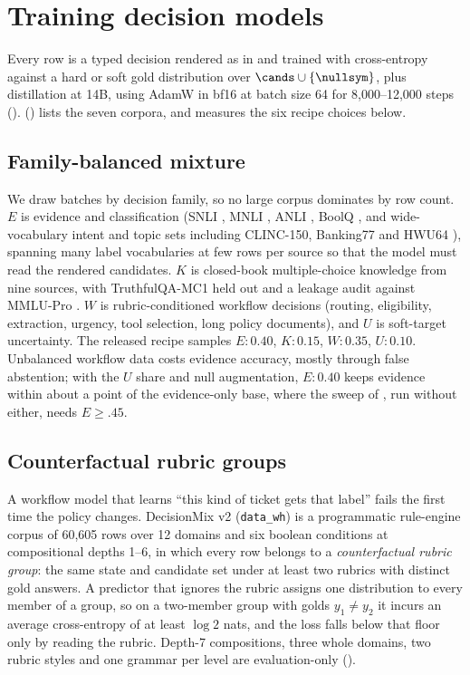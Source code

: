 \section{Training decision models}
\label{sec:train}

Every row is a typed decision rendered as in  and trained with cross-entropy
against a hard or soft gold distribution over $\cands \cup \{\nullsym\}$, plus distillation at 14B,
using AdamW in bf16 at batch size 64 for 8{,}000--12{,}000 steps ().
 () lists the seven corpora, and 
measures the six recipe choices below.

\subsection{Family-balanced mixture}
\label{sec:train:mixture}

We draw batches by decision family, so no large corpus dominates by row count. $E$ is evidence and
classification (SNLI \citep{bowman2015snli}, MNLI \citep{williams2018mnli}, ANLI \citep{nie2020anli},
BoolQ \citep{clark2019boolq}, and wide-vocabulary intent and topic sets including CLINC-150, Banking77 and
HWU64 \citep{larson2019clinc,casanueva2020banking77}), spanning many label vocabularies at few rows per
source so that the model must read the rendered candidates. $K$ is closed-book multiple-choice knowledge
from nine sources, with TruthfulQA-MC1 \citep{lin2022truthfulqa} held out and a leakage audit against
MMLU-Pro \citep{wang2024mmlupro,hendrycks2021mmlu}. $W$ is rubric-conditioned workflow decisions (routing,
eligibility, extraction, urgency, tool selection, long policy documents), and $U$ is soft-target
uncertainty. The released recipe samples $E{:}0.40$, $K{:}0.15$, $W{:}0.35$, $U{:}0.10$. Unbalanced workflow data costs
evidence accuracy, mostly through false abstention; with the $U$ share and null augmentation, $E{:}0.40$ keeps
evidence within about a point of the evidence-only base, where the sweep of ,
run without either, needs $E \ge .45$.

\subsection{Counterfactual rubric groups}
\label{sec:train:rubric}

A workflow model that learns ``this kind of ticket gets that label'' fails the first time the policy
changes. DecisionMix v2 (\texttt{data\_wh}) is a programmatic rule-engine corpus of 60{,}605 rows over 12
domains and six boolean conditions at compositional depths 1--6, in which every row belongs to a
\emph{counterfactual rubric group}: the same state and candidate set under at least two rubrics with
distinct gold answers. A predictor that ignores the rubric assigns one distribution to every member of a
group, so on a two-member group with golds $y_1 \neq y_2$ it incurs an average cross-entropy of at least
$\log 2$ nats, and the loss falls below that floor only by reading the rubric. Depth-7 compositions,
three whole domains, two rubric styles and one grammar per level are evaluation-only ().

